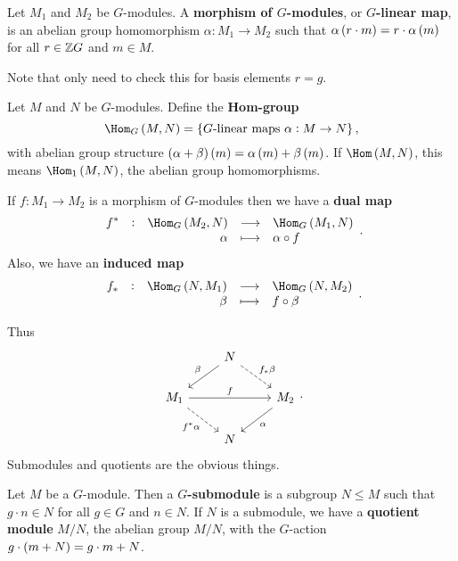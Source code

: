 \begin{definition}
Let $ M_1 $ and $ M_2 $ be $ G $-modules. A \textbf{morphism of $ G $-modules}, or \textbf{$ G $-linear map}, is an abelian group homomorphism $ \alpha : M_1 \to M_2 $ such that $ \alpha\br{r \cdot m} = r \cdot \alpha\br{m} $ for all $ r \in \mathbb{Z} G $ and $ m \in M $.
\end{definition}

Note that only need to check this for basis elements $ r = g $.

\begin{definition}
Let $ M $ and $ N $ be $ G $-modules. Define the \textbf{Hom-group}
$$ \Hom_G\br{M, N} = \cbr{\text{$ G $-linear maps} \ \alpha : M \to N}, $$
with abelian group structure $ \br{\alpha + \beta}\br{m} = \alpha\br{m} + \beta\br{m} $. If $ \Hom\br{M, N} $, this means $ \Hom_1\br{M, N} $, the abelian group homomorphisms.
\end{definition}

\begin{definition}
If $ f : M_1 \to M_2 $ is a morphism of $ G $-modules then we have a \textbf{dual map}
$$ \function[f^*]{\Hom_G\br{M_2, N}}{\Hom_G\br{M_1, N}}{\alpha}{\alpha \circ f}. $$
Also, we have an \textbf{induced map}
$$ \function[f_*]{\Hom_G\br{N, M_1}}{\Hom_G\br{N, M_2}}{\beta}{f \circ \beta}. $$
\end{definition}

Thus
$$
\begin{tikzcd}
& N \arrow{dl}[swap]{\beta} \arrow[dashed]{dr}{f_*\beta} & \\
M_1 \arrow{rr}{f} \arrow[dashed]{dr}[swap]{f^*\alpha} & & M_2 \arrow{dl}{\alpha} \\
& N &
\end{tikzcd}.
$$
Submodules and quotients are the obvious things.

\begin{definition}
Let $ M $ be a $ G $-module. Then a \textbf{$ G $-submodule} is a subgroup $ N \le M $ such that $ g \cdot n \in N $ for all $ g \in G $ and $ n \in N $. If $ N $ is a submodule, we have a \textbf{quotient module} $ M / N $, the abelian group $ M / N $, with the $ G $-action $ g \cdot \br{m + N} = g \cdot m + N $.
\end{definition}

\pagebreak

